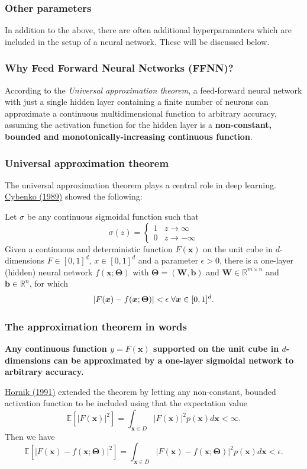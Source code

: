 \documentclass{beamer}
\begin{document}
\begin{frame}
\frametitle{Other parameters}

In addition to the above, there are often additional hyperparamaters
which are included in the setup of a neural network. These will be
discussed below.
\end{frame}

\begin{frame}
\frametitle{Why Feed Forward Neural Networks (FFNN)?}

According to the \emph{Universal approximation theorem}, a feed-forward
neural network with just a single hidden layer containing a finite
number of neurons can approximate a continuous multidimensional
function to arbitrary accuracy, assuming the activation function for
the hidden layer is a \textbf{non-constant, bounded and
monotonically-increasing continuous function}.
\end{frame}

\begin{frame}
\frametitle{Universal approximation theorem}

The universal approximation theorem plays a central role in deep
learning.  \href{{https://link.springer.com/article/10.1007/BF02551274}}{Cybenko (1989)} showed
the following:

\begin{block}{}
Let $\sigma$ be any continuous sigmoidal function such that
\[
\sigma(z) = \left\{\begin{array}{cc} 1 & z\rightarrow \infty\\ 0 & z \rightarrow -\infty \end{array}\right.
\]
Given a continuous and deterministic function $F(\bm{x})$ on the unit
cube in $d$-dimensions $F\in [0,1]^d$, $x\in [0,1]^d$ and a parameter
$\epsilon >0$, there is a one-layer (hidden) neural network
$f(\bm{x};\bm{\Theta})$ with $\bm{\Theta}=(\bm{W},\bm{b})$ and $\bm{W}\in
\mathbb{R}^{m\times n}$ and $\bm{b}\in \mathbb{R}^{n}$, for which
\[
\vert F(\bm{x})-f(\bm{x};\bm{\Theta})\vert < \epsilon \hspace{0.1cm} \forall \bm{x}\in[0,1]^d.
\]

\end{block}
\end{frame}

\begin{frame}
\frametitle{The approximation theorem in words}

\textbf{Any continuous function $y=F(\bm{x})$ supported on the unit cube in
$d$-dimensions can be approximated by a one-layer sigmoidal network to
arbitrary accuracy.}

\href{{https://www.sciencedirect.com/science/article/abs/pii/089360809190009T}}{Hornik (1991)} extended the theorem by letting any non-constant, bounded activation function to be included using that the expectation value
\[
\mathbb{E}[\vert F(\bm{x})\vert^2] =\int_{\bm{x}\in D} \vert F(\bm{x})\vert^2p(\bm{x})d\bm{x} < \infty.
\]
Then we have
\[
\mathbb{E}[\vert F(\bm{x})-f(\bm{x};\bm{\Theta})\vert^2] =\int_{\bm{x}\in D} \vert F(\bm{x})-f(\bm{x};\bm{\Theta})\vert^2p(\bm{x})d\bm{x} < \epsilon.
\]
\end{frame}
\end{document}
